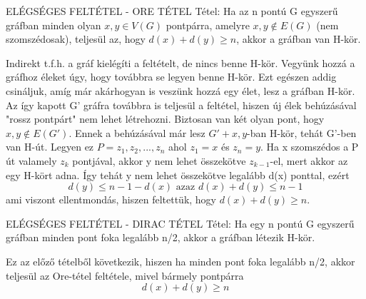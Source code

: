 \documentclass[]{article}
\begin{document}
\begin{framed}
ELÉGSÉGES FELTÉTEL - ORE TÉTEL Tétel: Ha az n pontú G egyszerű gráfban minden olyan $x,y\in V(G)$ pontpárra, amelyre ${x,y}\not\in E(G)$ (nem szomszédosak), teljesül az, hogy $d(x) + d(y) \geq n$, akkor a gráfban van H-kör.
\end{framed}
\begin{leftbar}
Indirekt t.f.h. a gráf kielégíti a feltételt, de nincs benne H-kör. Vegyünk hozzá a gráfhoz éleket úgy, hogy továbbra se legyen benne H-kör. Ezt egészen addig csináljuk, amíg már akárhogyan is veszünk hozzá egy élet, lesz a gráfban H-kör. Az így kapott G' gráfra továbbra is teljesül a feltétel, hiszen új élek behúzásával "rossz pontpárt" nem lehet létrehozni. Biztosan van két olyan pont, hogy ${x,y} \not \in E(G')$. Ennek a behúzásával már lesz $G' + {x,y}$-ban H-kör, tehát G'-ben van H-út. Legyen ez $P = {z_1, z_2,...,z_n}$ ahol $z_1 = x$ és $z_n = y$.
Ha x szomszédos a P út valamely $z_k$ pontjával, akkor y nem lehet összekötve $z_{k-1}$-el, mert akkor az egy H-kört adna. Így tehát y nem lehet összekötve legalább d(x) ponttal, ezért
$$d(y) \leq n - 1 - d(x) \text{ azaz } d(x)+d(y) \leq n-1$$
ami viszont ellentmondás, hiszen feltettük, hogy $d(x)+d(y) \geq n$.
\end{leftbar}
\begin{framed}
ELÉGSÉGES FELTÉTEL - DIRAC TÉTEL Tétel: Ha egy n pontú G egyszerű gráfban minden pont foka legalább n/2, akkor a gráfban létezik H-kör.
\end{framed}
\begin{leftbar}
Ez az előző tételből következik, hiszen ha minden pont foka legalább n/2, akkor teljesül az Ore-tétel feltétele, mivel bármely pontpárra $$d(x) + d(y) \geq n$$
\end{leftbar}
\end{document}
